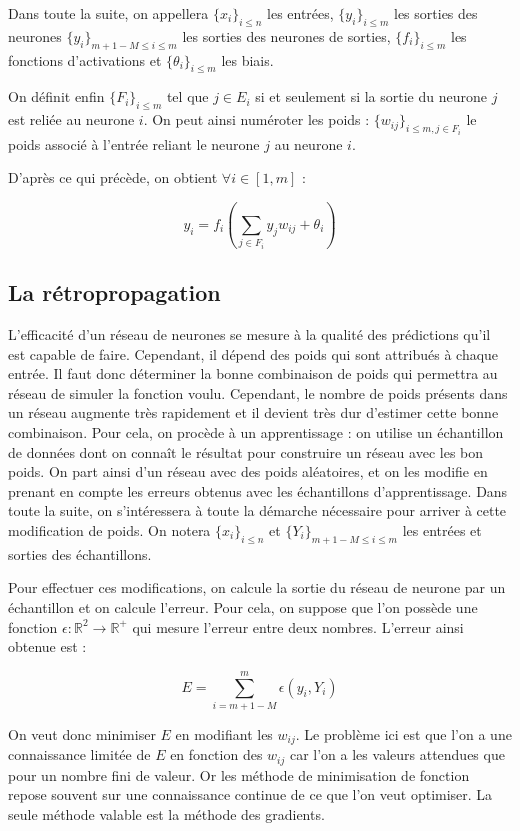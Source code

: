 Dans toute la suite, on appellera $\{x_i\}_{i \leq n}$ les entrées, $\{y_i\}_{i \leq m}$ les sorties des neurones $\{y_i\}_{m+1-M \leq i \leq m}$ les sorties des neurones de sorties, $\{f_i\}_{i \leq m}$ les fonctions d'activations et $\{\theta_i\}_{i \leq m}$ les biais.

On définit enfin $\{F_i\}_{i \leq m}$ tel que $j \in E_i$ si et seulement si la sortie du neurone $j$ est reliée au neurone $i$. On peut ainsi numéroter les poids : $\{w_{ij}\}_{i \leq m, j \in F_i} $ le poids associé à l'entrée reliant le neurone $j$ au neurone $i$.

D'après ce qui précède, on obtient $\forall i \in [1, m]$ :

\[y_i = f_i(\sum_{j \in F_i} y_jw_{ij} + \theta_i) \]

\subsection{La rétropropagation}

L'efficacité d'un réseau de neurones se mesure à la qualité des prédictions qu'il est capable de faire. Cependant, il dépend des poids qui sont attribués à chaque entrée. Il faut donc déterminer la bonne combinaison de poids qui permettra au réseau de simuler la fonction voulu. Cependant, le nombre de poids présents dans un réseau augmente très rapidement et il devient très dur d'estimer cette bonne combinaison. Pour cela, on procède à un apprentissage : on utilise un échantillon de données dont on connaît le résultat pour construire un réseau avec les bon poids. On part ainsi d'un réseau avec des poids aléatoires, et on les modifie en prenant en compte les erreurs obtenus avec les échantillons d'apprentissage. Dans toute la suite, on s'intéressera à toute la démarche nécessaire pour arriver à cette modification de poids. On notera $\{x_i\}_{i \leq n}$ et $\{Y_i\}_{m+1-M \leq i \leq m}$ les entrées et sorties des échantillons.

Pour effectuer ces modifications, on calcule la sortie du réseau de neurone par un échantillon et on calcule l'erreur. Pour cela, on suppose que l'on possède une fonction $\epsilon : \mathbb{R}^2 \to \mathbb{R}^{+}$ qui mesure l'erreur entre deux nombres. L'erreur ainsi obtenue est :

\[ E = \sum_{i = m+1-M}^m \epsilon(y_i, Y_i)\]

On veut donc minimiser $E$ en modifiant les $w_{ij}$. Le problème ici est que l'on a une connaissance limitée de $E$ en fonction des $w_{ij}$ car l'on a les valeurs attendues que pour un nombre fini de valeur. Or les méthode de minimisation de fonction repose souvent sur une connaissance continue de ce que l'on veut optimiser. La seule méthode valable est la méthode des gradients.

